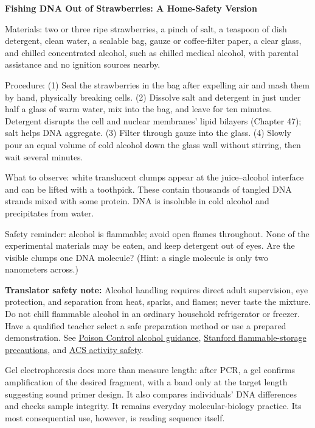 \begin{shiyan}
\textbf{Fishing DNA Out of Strawberries: A Home-Safety Version}

Materials: two or three ripe strawberries, a pinch of salt, a teaspoon of dish detergent, clean water, a sealable bag, gauze or coffee-filter paper, a clear glass, and chilled concentrated alcohol, such as chilled medical alcohol, with parental assistance and no ignition sources nearby.

Procedure: (1) Seal the strawberries in the bag after expelling air and mash them by hand, physically breaking cells. (2) Dissolve salt and detergent in just under half a glass of warm water, mix into the bag, and leave for ten minutes. Detergent disrupts the cell and nuclear membranes' lipid bilayers (Chapter 47); salt helps DNA aggregate. (3) Filter through gauze into the glass. (4) Slowly pour an equal volume of cold alcohol down the glass wall without stirring, then wait several minutes.

What to observe: white translucent clumps appear at the juice--alcohol interface and can be lifted with a toothpick. These contain thousands of tangled DNA strands mixed with some protein. DNA is insoluble in cold alcohol and precipitates from water.

Safety reminder: alcohol is flammable; avoid open flames throughout. None of the experimental materials may be eaten, and keep detergent out of eyes. Are the visible clumps one DNA molecule? (Hint: a single molecule is only two nanometers across.)
\end{shiyan}

\textbf{Translator safety note:} Alcohol handling requires direct adult supervision, eye protection, and separation from heat, sparks, and flames; never taste the mixture. Do not chill flammable alcohol in an ordinary household refrigerator or freezer. Have a qualified teacher select a safe preparation method or use a prepared demonstration. See \href{https://www.poison.org/articles/rubbing-alcohol-only-looks-like-water}{Poison Control alcohol guidance}, \href{https://ehs.stanford.edu/wp-content/uploads/Lab-Compliance-Cheat-Sheet.pdf}{Stanford flammable-storage precautions}, and \href{https://www.acs.org/education/celebrating-chemistry-editions/2024-ccew/science-safety-tips.html}{ACS activity safety}.

Gel electrophoresis does more than measure length: after PCR, a gel confirms amplification of the desired fragment, with a band only at the target length suggesting sound primer design. It also compares individuals' DNA differences and checks sample integrity. It remains everyday molecular-biology practice. Its most consequential use, however, is reading sequence itself.

